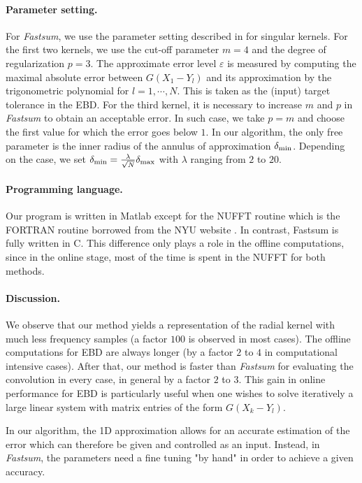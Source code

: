 \documentclass[main]{subfiles}
\begin{document}
\paragraph{Parameter setting.}
For \textit{Fastsum}, we use the parameter setting described in \cite{potts2004fast} for singular kernels. For the first two kernels, we use the cut-off parameter $m= 4$ and the degree of regularization $p = 3$. The approximate error level $\varepsilon$ is measured by computing the maximal absolute error between $G(X_1 - Y_l)$ and its approximation by the trigonometric polynomial for $l = 1, \cdots, N$. This is taken as the (input) target tolerance in the EBD. For the third kernel, it is necessary to increase $m$ and $p$ in \textit{Fastsum} to obtain an acceptable error. In such case, we take $p = m$ and choose the first value for which the error goes below $1$. In our algorithm, the only free parameter is the inner radius of the annulus of approximation $\delta_{\min}$. Depending on the case, we set $\delta_{\min} = \frac{\lambda}{\sqrt{N}} \delta_{\max}$ with $\lambda$ ranging from $2$ to $20$. 

\paragraph{Programming language.}
Our program is written in Matlab except for the NUFFT routine which is the FORTRAN routine borrowed from the NYU website \cite{NUFFTGg}. In contrast, Fastsum is fully written in C. This difference only plays a role in the offline computations, since in the online stage, most of the time is spent in the NUFFT for both methods. 
\paragraph{Discussion.}
We observe that our method yields a representation of the radial kernel with much less frequency samples (a factor $100$ is observed in most cases). The offline computations for EBD are always longer (by a factor $2$ to $4$ in computational intensive cases). After that, our method is faster than \textit{Fastsum} for evaluating the convolution in every case, in general by a factor $2$ to $3$. This gain in online performance for EBD is particularly useful when one wishes to solve iteratively a large linear system with matrix entries of the form $G(X_k - Y_l)$. 

In our algorithm, the 1D approximation allows for an accurate estimation of the error which can therefore be given and controlled as an input. Instead, in \textit{Fastsum}, the parameters need a fine tuning "by hand" in order to achieve a given accuracy. 
\end{document}
